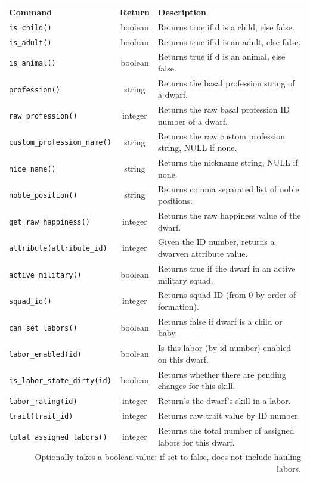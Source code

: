 \documentclass[]{article}
\begin{document}
\begin{tabular}{l c l}
\textbf{Command} & \textbf{Return} & \textbf{Description}\\
\texttt{is\_child()} & boolean & Returns true if d is a child, else false.\\
\texttt{is\_adult()} & boolean & Returns true if d is an adult, else false.\\
\texttt{is\_animal()} & boolean & Returns true if d is an animal, else false.\\
\texttt{profession()} & string & Returns the basal profession string of a dwarf.\\
\texttt{raw\_profession()} & integer & Returns the raw basal profession ID number of a dwarf.\\
\texttt{custom\_profession\_name()} & string &  Returns the raw custom profession string, NULL if none.\\
\texttt{nice\_name()} & string & Returns the nickname string, NULL if none.\\
\texttt{noble\_position()} & string & Returns comma separated list of noble positions.\\
\texttt{get\_raw\_happiness()} & integer & Returns the raw happiness value of the dwarf.\\
\texttt{attribute(attribute\_id)} & integer & Given the ID number, returns a dwarven attribute value.\\
\texttt{active\_military()} & boolean & Returns true if the dwarf in an active military squad.\\
\texttt{squad\_id()} & integer & Returns squad ID (from 0 by order of formation).\\
\texttt{can\_set\_labors()} & boolean & Returns false if dwarf is a child or baby.\\
\texttt{labor\_enabled(id)} & boolean & Is this labor (by id number) enabled on this dwarf.\\
\texttt{is\_labor\_state\_dirty(id)} & boolean & Returns whether there are pending changes for this skill.\\
\texttt{labor\_rating(id)} & integer & Return's the dwarf's skill in a labor.\\
\texttt{trait(trait\_id)} & integer & Returns raw trait value by ID number.\\
\texttt{total\_assigned\_labors()} & integer & Returns the total number of assigned labors for this dwarf.\\
\multicolumn{3}{r}{Optionally takes a boolean value: if set to false, does not include hauling labors.}\\

\end{tabular}
\end{document}
